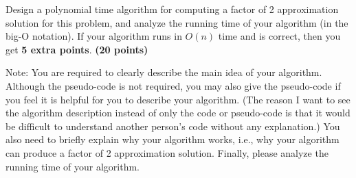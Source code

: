 \documentclass{article}
\begin{document}
Design a polynomial time algorithm for computing a factor of 2
approximation solution for this problem, and analyze the running time
of your algorithm (in the big-O notation). If your algorithm runs in
$O(n)$ time and is correct, then you get {\bf 5 extra points}. {\bf(20
  points)} 

Note: You are required to clearly describe the main idea of your
algorithm. Although the pseudo-code is not required, you may also give
the pseudo-code if you feel it is helpful for you to describe your
algorithm. (The reason I want to see the algorithm description instead
of only the code or pseudo-code is that it would be difficult to
understand another person's code without any explanation.) You also
need to briefly explain why your algorithm works, i.e., why your
algorithm can produce a factor of 2 approximation solution. Finally,
please analyze the running time of your algorithm. 
\end{document}
